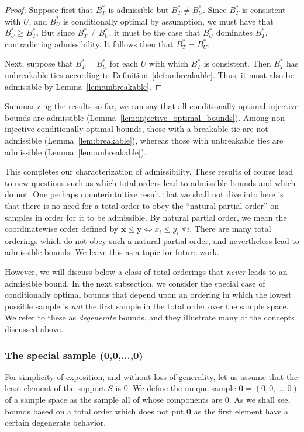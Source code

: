\documentclass{article}
\theoremstyle{definition}
\theoremstyle{remark}
\newcounter{assumption}%
\newcommand{\y}{\mathbf{y}}
\def\y{\mathbf{y}}
\def\x{\mathbf{x}}
\begin{document}
\begin{proof}
    Suppose first that $B^*_T$ is admissible but $B^*_T \neq B^*_U$. Since $B^*_T$ is consistent with $U$, and $B^*_U$ is conditionally optimal by assumption, we must have that $B^*_U \geq B^*_T$. But since $B^*_T \neq B^*_U$, it must be the case that $B^*_U$ dominates $B^*_T$, contradicting admissibility. It follows then that $B^*_T = B^*_U$.
    
    Next, suppose that $B^*_T = B^*_U$ for each $U$ with which $B^*_T$ is consistent. Then $B^*_T$ has unbreakable ties according to Definition~\ref{def:unbreakable}. Thus, it must also be admissible by Lemma~\ref{lem:unbreakable}.
\end{proof}
\color{black}

Summarizing the results so far, we can say that all conditionally optimal injective bounds are admissible (Lemma~\ref{lem:injective_optimal_bounds}). Among non-injective conditionally optimal bounds, those with a breakable tie are not admissible (Lemma~\ref{lem:breakable}), whereas those with unbreakable ties are admissible (Lemma~\ref{lem:unbreakable}).

This completes our characterization of admissibility. These results of course lead to new questions such as which total orders lead to admissible bounds and which do not.  One perhaps counterintuitive result that we shall not dive into here is that there is no need for a total order to obey the ``natural partial order'' on samples in order for it to be admissible. By natural partial order, we mean the coordinatewise order defined by $\x\leq\y \iff x_i\leq y_i \; \forall i$. There are many total orderings which do not obey such a natural partial order, and nevertheless lead to admissible bounds. We leave this as a topic for future work.

However, we will discuss below a class of total orderings that {\em never} leads to an admissible bound. 
In the next subsection, we consider the special case of conditionally optimal bounds that depend upon an ordering in which the lowest possible sample is {\em not} the first sample in the total order over the sample space. We refer to these as {\em degenerate} bounds, and they illustrate many of the concepts discussed above.

\subsubsection{The special sample (0,0,...,0)}
For simplicity of exposition, and without loss of generality, let us assume that the least element of the support $S$ is $0$. We define the unique sample $\mathbf{0}=(0,0,...,0)$ of a sample space as the sample all of whose components are 0. As we shall see, bounds based on a total order which does not put $\mathbf{0}$ as the first element have a certain degenerate behavior.
\end{document}
